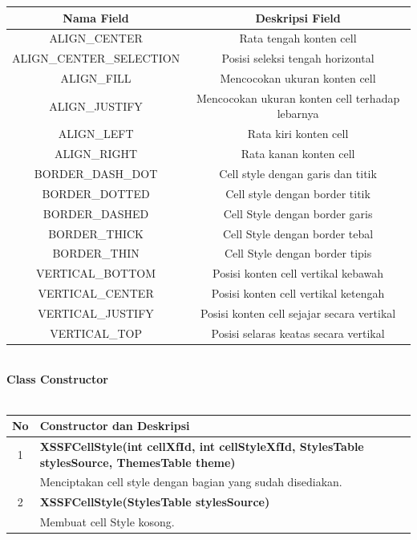 	\begin{tabular}{|c|c|}
		\hline
		\textbf{Nama Field} & \textbf{Deskripsi Field} \\ \hline \hline
		ALIGN\_CENTER & Rata tengah konten cell\\ \hline 
		ALIGN\_CENTER\_SELECTION &	Posisi seleksi tengah horizontal\\ \hline 
		ALIGN\_FILL & Mencocokan ukuran konten cell \\ \hline
		ALIGN\_JUSTIFY	&	Mencocokan ukuran konten cell terhadap lebarnya\\ \hline
		ALIGN\_LEFT	&	Rata kiri konten cell\\ \hline
		ALIGN\_RIGHT &	Rata kanan konten cell\\ \hline
		BORDER\_DASH\_DOT &	Cell style dengan garis dan titik \\ \hline
		BORDER\_DOTTED &	Cell style dengan border titik\\ \hline
		BORDER\_DASHED &	Cell Style dengan border garis\\ \hline
		BORDER\_THICK &	Cell Style dengan border tebal\\ \hline
		BORDER\_THIN &	Cell Style dengan border tipis\\ \hline
		VERTICAL\_BOTTOM &	Posisi konten cell vertikal kebawah\\ \hline
		VERTICAL\_CENTER &	Posisi konten cell vertikal ketengah\\ \hline
		VERTICAL\_JUSTIFY &	Posisi konten cell sejajar secara vertikal \\ \hline
		VERTICAL\_TOP &	Posisi selaras keatas secara vertikal\\ \hline
	\end{tabular}
\\
\noindent \textbf{Class Constructor}\\ \\
	\begin{tabular}{|c|p{15cm}|}
		\hline
		\textbf{No} & \textbf{Constructor dan Deskripsi} \\ \hline \hline
		1 & \textbf{XSSFCellStyle(int cellXfId, int cellStyleXfId, StylesTable stylesSource, ThemesTable theme)}\\
			&	Menciptakan cell style dengan bagian yang sudah disediakan.\\ \hline
		2 & \textbf{XSSFCellStyle(StylesTable stylesSource)}\\
			&	Membuat cell Style kosong.\\ \hline 	
	\end{tabular}
